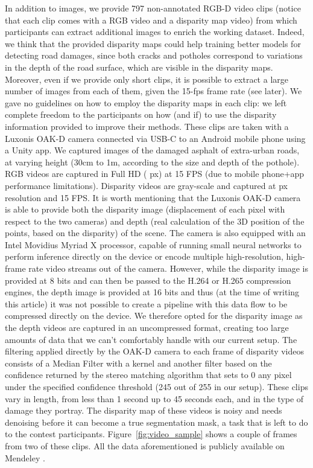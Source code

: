 \documentclass[twocolumn]{article}
\newcommand{\Bhref}[3][blue]{\href{#2}{\color{#1}{#3}}}
\begin{document}
In addition to images, we provide 797 non-annotated RGB-D video clips (notice that each clip comes with a RGB video and a disparity map video) from which participants can extract additional images to enrich the working dataset. Indeed, we think that the provided disparity maps could help training better models for detecting road damages, since both cracks and potholes correspond to variations in the depth of the road surface, which are visible in the disparity maps. Moreover, even if we provide only short clips, it is possible to extract a large number of images from each of them, given the 15-fps frame rate (see later). We gave no guidelines on how to employ the disparity maps in each clip: we left complete freedom to the participants on how (and if) to use the disparity information provided to improve their methods. These clips are taken with a Luxonis OAK-D camera connected via USB-C to an Android mobile phone using a Unity app. We captured images of the damaged asphalt of extra-urban roads, at varying height (30cm to 1m, according to the size and depth of the pothole). RGB videos are captured in Full HD ( px) at 15 FPS (due to mobile phone+app performance limitations). Disparity videos are gray-scale and captured at  px resolution and 15 FPS.
It is worth mentioning that the Luxonis OAK-D camera is able to provide both the disparity image (displacement of each pixel with respect to the two cameras) and depth (real calculation of the 3D position of the points, based on the disparity) of the scene. The camera is also equipped with an Intel Movidius Myriad X processor, capable of running small neural networks to perform inference directly on the device or encode multiple high-resolution, high-frame rate video streams out of the camera. However, while the disparity image is provided at 8 bits and can then be passed to the H.264 or H.265 compression engines, the depth image is provided at 16 bits and thus (at the time of writing this article) it was not possible to create a pipeline with this data flow to be compressed directly on the device.
We therefore opted for the disparity image as the depth videos are captured in an uncompressed format, creating too large amounts of data that we can't comfortably handle with our current setup. The filtering applied directly by the OAK-D camera to each frame of disparity videos consists of a Median Filter with a  kernel and another filter based on the confidence returned by the stereo matching algorithm that sets to 0 any pixel under the specified confidence threshold (245 out of 255 in our setup). These clips vary in length, from less than 1 second up to 45 seconds each, and in the type of damage they portray. The disparity map of these videos is noisy and needs denoising before it can become a true segmentation mask, a task that is left to do to the contest participants. Figure~\ref{fig:video_sample} shows a couple of frames from two of these clips. All the data aforementioned is publicly available on Mendeley \Bhref{https://data.mendeley.com/datasets/kfth5g2xk3/1}{at this link}.
\end{document}
